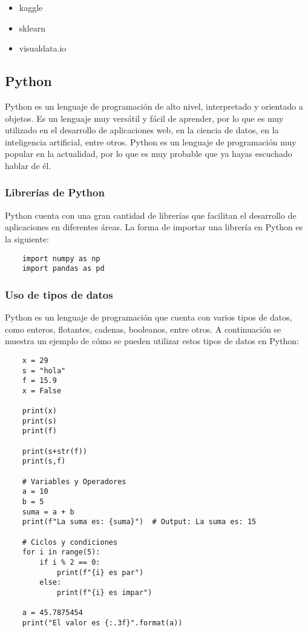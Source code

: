 \documentclass{templateNote}
\begin{document}
\begin{itemize}
    \item kaggle
    \item sklearn
    \item visualdata.io
\end{itemize}


\subsection{Python}
Python es un lenguaje de programación de alto nivel, interpretado y orientado a objetos. Es un lenguaje muy versátil y fácil de aprender, por lo que es muy utilizado en el desarrollo de aplicaciones web, en la ciencia de datos, en la inteligencia artificial, entre otros. Python es un lenguaje de programación muy popular en la actualidad, por lo que es muy probable que ya hayas escuchado hablar de él.

\subsubsection*{Librerías de Python}
Python cuenta con una gran cantidad de librerías que facilitan el desarrollo de aplicaciones en diferentes áreas. La forma de importar una librería en Python es la siguiente:
\begin{lstlisting}
    import numpy as np
    import pandas as pd
\end{lstlisting}

\subsubsection*{Uso de tipos de datos}
Python es un lenguaje de programación que cuenta con varios tipos de datos, como enteros, flotantes, cadenas, booleanos, entre otros. A continuación se muestra un ejemplo de cómo se pueden utilizar estos tipos de datos en Python:
\begin{lstlisting}
    x = 29
    s = "hola"
    f = 15.9
    x = False

    print(x)
    print(s)
    print(f)

    print(s+str(f))
    print(s,f)

    # Variables y Operadores
    a = 10
    b = 5
    suma = a + b
    print(f"La suma es: {suma}")  # Output: La suma es: 15

    # Ciclos y condiciones
    for i in range(5):
        if i % 2 == 0:
            print(f"{i} es par")
        else:
            print(f"{i} es impar")

    a = 45.7875454
    print("El valor es {:.3f}".format(a))
\end{lstlisting}
\end{document}
